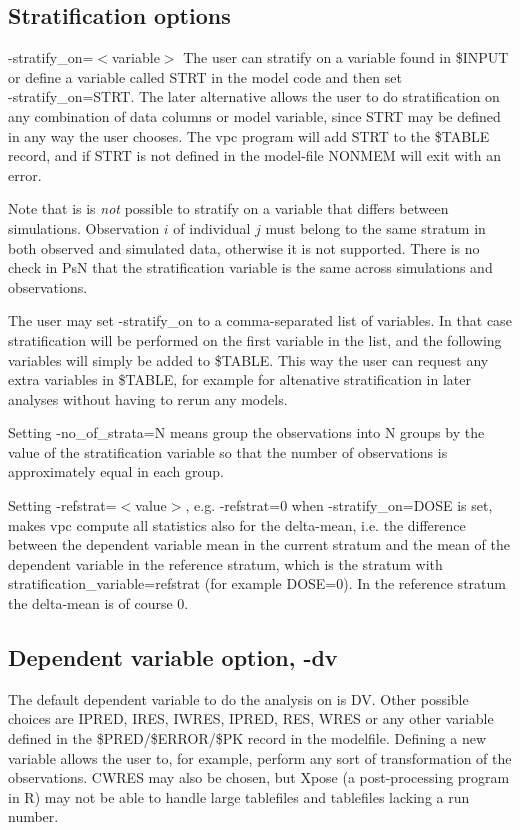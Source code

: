 \subsection{Stratification options}
-stratify\_on=$<$variable$>$ The user can stratify on a variable found in \$INPUT or define a variable called STRT in the model code and then set\\ -stratify\_on=STRT. The later alternative allows the user to do stratification on any combination of data columns or model variable, since STRT may be defined in any way the user chooses. The vpc program will add STRT to the \$TABLE record, and if STRT is not defined in the model-file NONMEM will exit with an error. 

Note that is is
\emph{not} possible to stratify on a variable that differs between simulations. 
Observation $i$ of individual $j$ must belong to the same stratum in
both observed and simulated data, otherwise it is not supported. 
There is no check in PsN that the
stratification variable is the same across simulations and observations.

The user may set -stratify\_on to a comma-separated list of variables. In that case stratification will be performed on the first variable in the list, and the following variables will simply be added to \$TABLE. This way the user can request any extra variables in \$TABLE, for example for altenative stratification in later analyses without having to rerun any models.


Setting -no\_of\_strata=N means group the observations into N groups by the value of the stratification variable so that the number of observations is approximately equal in each group.

Setting -refstrat=$<$value$>$, e.g. -refstrat=0 when -stratify\_on=DOSE is set, makes vpc compute all statistics also for the delta-mean, i.e. the difference between the dependent variable mean in the current stratum and the mean of the dependent variable in the reference stratum, which is the stratum with stratification\_variable=refstrat (for example DOSE=0). In the reference stratum the delta-mean is of course 0.

\subsection{Dependent variable option, -dv}
The default dependent variable to do the analysis on is DV. Other possible choices are IPRED, IRES, IWRES, IPRED, RES, WRES or any other variable defined in the \$PRED/\$ERROR/\$PK record in the modelfile. Defining a new variable allows the user to, for example, perform any sort of transformation of the observations. CWRES may also be chosen, but Xpose (a post-processing program in R) may not be able to handle large tablefiles and tablefiles lacking a run number. 

